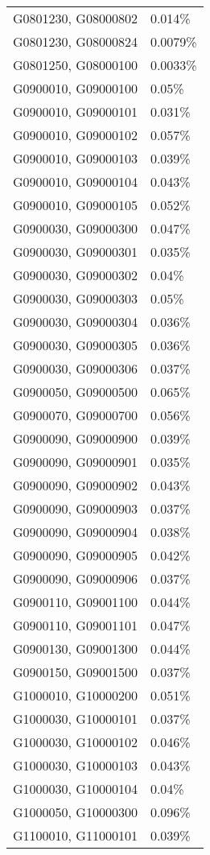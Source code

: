 \begin{longtable}[]{@{}ll@{}}
G0801230, G08000802 & 0.014\% \\
G0801230, G08000824 & 0.0079\% \\
G0801250, G08000100 & 0.0033\% \\
G0900010, G09000100 & 0.05\% \\
G0900010, G09000101 & 0.031\% \\
G0900010, G09000102 & 0.057\% \\
G0900010, G09000103 & 0.039\% \\
G0900010, G09000104 & 0.043\% \\
G0900010, G09000105 & 0.052\% \\
G0900030, G09000300 & 0.047\% \\
G0900030, G09000301 & 0.035\% \\
G0900030, G09000302 & 0.04\% \\
G0900030, G09000303 & 0.05\% \\
G0900030, G09000304 & 0.036\% \\
G0900030, G09000305 & 0.036\% \\
G0900030, G09000306 & 0.037\% \\
G0900050, G09000500 & 0.065\% \\
G0900070, G09000700 & 0.056\% \\
G0900090, G09000900 & 0.039\% \\
G0900090, G09000901 & 0.035\% \\
G0900090, G09000902 & 0.043\% \\
G0900090, G09000903 & 0.037\% \\
G0900090, G09000904 & 0.038\% \\
G0900090, G09000905 & 0.042\% \\
G0900090, G09000906 & 0.037\% \\
G0900110, G09001100 & 0.044\% \\
G0900110, G09001101 & 0.047\% \\
G0900130, G09001300 & 0.044\% \\
G0900150, G09001500 & 0.037\% \\
G1000010, G10000200 & 0.051\% \\
G1000030, G10000101 & 0.037\% \\
G1000030, G10000102 & 0.046\% \\
G1000030, G10000103 & 0.043\% \\
G1000030, G10000104 & 0.04\% \\
G1000050, G10000300 & 0.096\% \\
G1100010, G11000101 & 0.039\% \\

\end{longtable}
